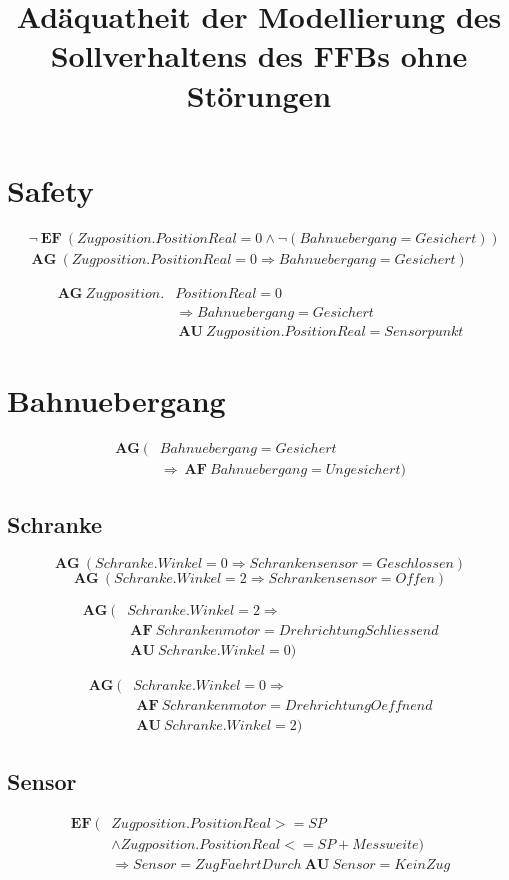 \documentclass[12pt,a4paper,draft]{article}
\title{Adäquatheit der Modellierung des Sollverhaltens des FFBs ohne Störungen}
\date{\vspace{-5ex}} %
\newcommand{\AF}{\ \textbf{AF}\ }
\newcommand{\AG}{\ \textbf{AG}\ }
\newcommand{\AU}{\ \textbf{AU}\ }
\newcommand{\EF}{\ \textbf{EF}\ }
\newcommand{\myeq}[1]{%
\begin{equation}
\begin{split}
#1
\end{split}
\end{equation}
}
\begin{document}
\maketitle


\section{Safety} 
\myeq{
&\neg \EF (Zugposition.PositionReal = 0 \land \neg (Bahnuebergang = Gesichert)) \\
&\AG (Zugposition.PositionReal = 0 \Rightarrow Bahnuebergang = Gesichert)
}
\myeq{
\AG Zugposition.&PositionReal = 0 \\
	& \Rightarrow Bahnuebergang = Gesichert \\
	& \AU Zugposition.PositionReal = Sensorpunkt
}

\section{Bahnuebergang}
\myeq{
\AG (&Bahnuebergang = Gesichert \\
	& \Rightarrow \AF Bahnuebergang = Ungesichert)
}

\subsection{Schranke}
\begin{equation}
\AG (Schranke.Winkel = 0 \Rightarrow Schrankensensor = Geschlossen)
\end{equation}
\begin{equation}
\AG (Schranke.Winkel = 2 \Rightarrow Schrankensensor = Offen)
\end{equation}

\myeq{
\AG (&Schranke.Winkel = 2 \Rightarrow \\
	& \AF Schrankenmotor = DrehrichtungSchliessend \\
	& \AU Schranke.Winkel = 0)
}
\myeq{
\AG (&Schranke.Winkel = 0 \Rightarrow \\
	& \AF Schrankenmotor = DrehrichtungOeffnend \\
	& \AU Schranke.Winkel = 2)
}

\subsection{Sensor}
\myeq{
\EF (&Zugposition.PositionReal >= SP \\
	& \land Zugposition.PositionReal <= SP + Messweite) \\
	& \Rightarrow Sensor = ZugFaehrtDurch \AU Sensor = KeinZug
}
\end{document}
